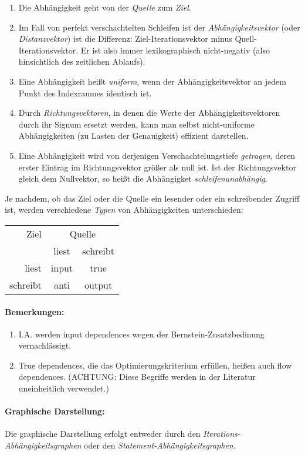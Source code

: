 \begin{enumerate}
\item Die Abhängigkeit geht von der \emph{Quelle} zum \emph{Ziel}.
\item Im Fall von perfekt verschachtelten Schleifen ist der
  \emph{Abhängigkeitsvektor} (oder \emph{Distanzvektor}) ist die Differenz: Ziel-Iterationsvektor minus
  Quell-Iterationsvektor. Er ist also immer lexikographisch nicht-negativ (also hinsichtlich des zeitlichen Ablaufs).
\item Eine Abhängigkeit heißt \emph{uniform}, wenn der Abhängigkeitsvektor an
  jedem Punkt des Indexraumes identisch ist.
\item Durch \emph{Richtungsvektoren}, in denen die Werte der
  Abhängigkeitsvektoren durch ihr Signum ersetzt werden, kann man selbst
  nicht-uniforme Abhängigkeiten (zu Lasten der Genauigkeit) effizient
  darstellen. 
\item Eine Abhängigkeit wird von derjenigen Verschachtelungstiefe
  \emph{getragen}, deren erster Eintrag im Richtungsvektor größer als
  null ist. Ist der Richtungsvektor gleich dem Nullvektor, so heißt die
  Abhängigket \emph{schleifenunabhängig}.
\end{enumerate}


Je nachdem, ob das Ziel oder die Quelle ein lesender oder ein
schreibender Zugriff ist, werden verschiedene \emph{Typen} von
Abhängigkeiten unterschieden: 

\smallskip

\begin{center}
\begin{tabular}{||r|cc||}
\hline
Ziel & \multicolumn{2}{|c||}{Quelle}\\
 & liest & schreibt \\
\hline
liest & input & true\\
schreibt & anti & output\\
\hline
\end{tabular}
\end{center}

\paragraph{Bemerkungen:} 

\begin{enumerate}
\item I.A. werden input dependences wegen der Bernstein-Zusatzbedinung
  vernachlässigt.
\item True dependences, die das Optimierungskriterium erfüllen, heißen
  auch flow dependences. (ACHTUNG: Diese Begriffe werden in der Literatur
  uneinheitlich verwendet.)
\end{enumerate}

\paragraph{Graphische Darstellung:}

Die graphische Darstellung erfolgt entweder durch den
\emph{Iterations-Abhängigkeitsgraphen} oder den
\emph{Statement-Abhängigkeitsgraphen}.
